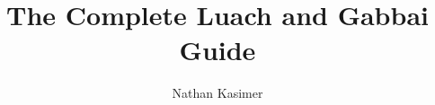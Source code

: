 \documentclass[11pt, openany]{book}
\begin{document}
	
	\title{The Complete Luach and Gabbai Guide}
	
	\author{Nathan Kasimer}
	
	\maketitle
	
	\tableofcontents

			
	
	
	
	
	
	
	
\end{document}
